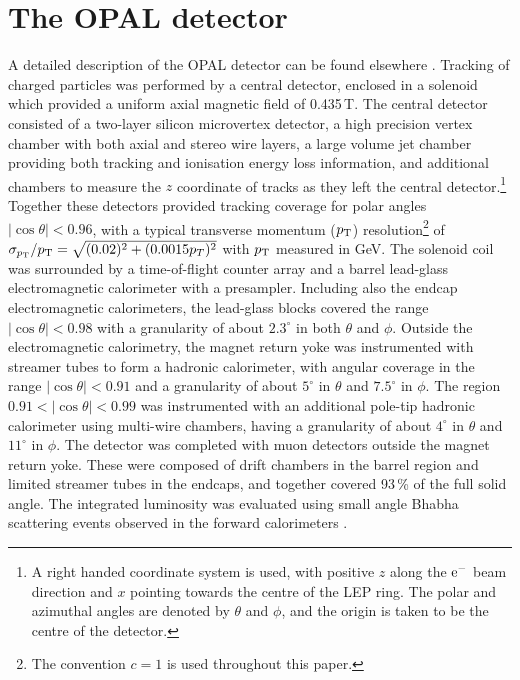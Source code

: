 \section{The OPAL detector}
\label{sec:detector}
A detailed description of the OPAL detector can be found elsewhere 
\cite{Ahmet:1990eg, Anderson:1997xwa}. Tracking of charged particles was performed by a central
detector, enclosed in a solenoid which provided a uniform axial magnetic field
of 0.435\,T.  The central detector consisted of a two-layer silicon 
microvertex detector, a high precision vertex chamber with both axial
and stereo wire layers, a large volume jet chamber providing both tracking
and ionisation energy loss information,
and additional chambers to measure the $z$ coordinate of tracks as they
left the central detector.\footnote{A right handed coordinate system is used,
with positive $z$ along the $\rm e^-$ beam direction and $x$ pointing 
towards the centre of the LEP ring. The polar and azimuthal angles are denoted
by $\theta$ and $\phi$, and the origin is taken to be the centre of the
detector.} Together these detectors provided tracking coverage for polar angles
$|\cos\theta|<0.96$, with a typical transverse momentum ($p_{\rm T}$) 
resolution\footnote{The convention $c=1$ is used throughout this paper.} of 
$\sigma_{p_{\rm T}}/p_{\rm T}=\sqrt{(0.02)^2+(0.0015p_T)^2}$ 
with $p_{\rm T}$ measured in GeV.
The solenoid coil was surrounded by a time-of-flight counter array and 
a barrel lead-glass electromagnetic calorimeter with a presampler. Including
also the endcap electromagnetic calorimeters, the lead-glass blocks covered
the range $|\cos\theta|<0.98$ with a granularity of about $2.3^\circ$ in both
$\theta$ and $\phi$.
Outside the electromagnetic calorimetry, 
the magnet return yoke was instrumented with
streamer tubes to form a hadronic calorimeter, with angular coverage in the
range $|\cos\theta|<0.91$ and a granularity of about $5^\circ$ in $\theta$
and $7.5^\circ$ in $\phi$. The region $0.91<|\cos\theta|<0.99$ was instrumented
with an additional pole-tip hadronic calorimeter using multi-wire chambers,
having a granularity of about $4^\circ$ in $\theta$ and $11^\circ$ in $\phi$.
The detector was completed
with muon detectors outside the magnet return yoke. These were composed
of drift chambers in the barrel region and limited streamer tubes in the
endcaps, and together covered 93\,\% of the full solid angle.
The integrated luminosity was evaluated using small
angle Bhabha scattering events observed in the forward calorimeters 
\cite{Abbiendi:2003dh}. 

